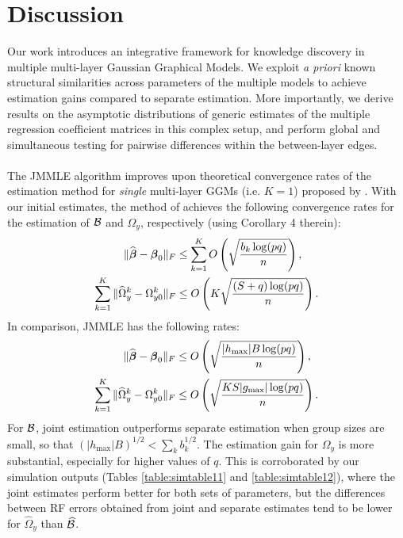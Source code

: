 \section{Discussion}
\label{sec:sec5}
Our work introduces an integrative framework for knowledge discovery in multiple multi-layer Gaussian Graphical Models. We exploit {\it a priori} known structural similarities across parameters of the multiple models to achieve estimation gains compared to separate estimation. More importantly, we derive results on the asymptotic distributions of generic estimates of the multiple regression coefficient matrices in this complex setup, and perform global and simultaneous testing for pairwise differences within the between-layer edges.

\paragraph{}
The JMMLE algorithm improves upon theoretical convergence rates of the estimation method for {\it single} multi-layer GGMs (i.e. $K=1$) proposed by \cite{LinEtal16}. With our initial estimates, the method of \cite{LinEtal16} achieves the following convergence rates for the estimation of ${\cal{B}}$ and $\Omega_y$, respectively (using Corollary 4 therein):
%
\begin{align*}
\| \widehat {{\boldsymbol{\beta}}} - {\boldsymbol{\beta}}_0 \|_F & \leq \sum_{k=1}^K O \left( \sqrt{ \frac{ b_k \log (p q)}{n}} \right), \\
\sum_{k=1}^K \| \widehat \Omega_y^k - \Omega_{y0}^k \|_F & \leq O \left( K \sqrt{ \frac{ (S + q) \log (pq)}{n}} \right).
\end{align*}
%
In comparison, JMMLE has the following rates:
%
\begin{align*}
\| \widehat {{\boldsymbol{\beta}}} - {\boldsymbol{\beta}}_0 \|_F & \leq O \left( \sqrt{ \frac{ |h_{\max}| B \log (p q)}{n}} \right), \\
\sum_{k=1}^K \| \widehat \Omega_y^k - \Omega_{y0}^k \|_F & \leq O \left( \sqrt{ \frac{ KS |g_{\max}| \log (p q)}{n}} \right).
\end{align*}
%
For ${\cal{B}}$, joint estimation outperforms separate estimation when group sizes are small, so that $(| h_{\max}| B)^{1/2} < \sum_k b_k^{1/2}$. The estimation gain for $\Omega_y$ is more substantial, especially for higher values of $q$. This is corroborated by our simulation outputs (Tables \ref{table:simtable11} and \ref{table:simtable12}), where the joint estimates perform better for both sets of parameters, but the differences between RF errors obtained from joint and separate estimates tend to be lower for $\widehat \Omega_y$ than $\widehat {{\cal{B}}}$.

